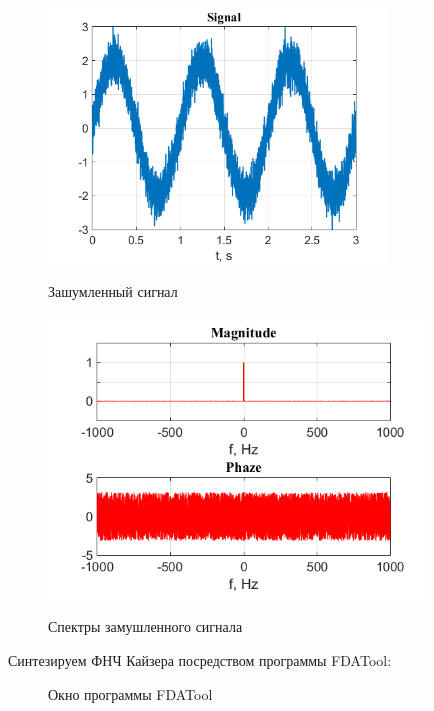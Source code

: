 \documentclass[a4paper,14pt]{article}
\begin{document}
\begin{figure}[h]
\begin{multicols}{1}
\hfill
\includegraphics[width=90mm]{noisy}
\hfill
\caption{Зашумленный сигнал}
\label{figBottom}
\hfill
\includegraphics[width=100mm]{noisy_spec}
\hfill
\caption{Спектры замушленного сигнала}
\label{figDown}
\end{multicols}
\end{figure}

\newpage
\hspace{0,5cm}Синтезируем ФНЧ Кайзера посредством программы FDATool:
\begin{figure}[bh]
\noindent{}
\caption{Окно программы FDATool}
\label{figCurves}
\end{figure}
\end{document}
